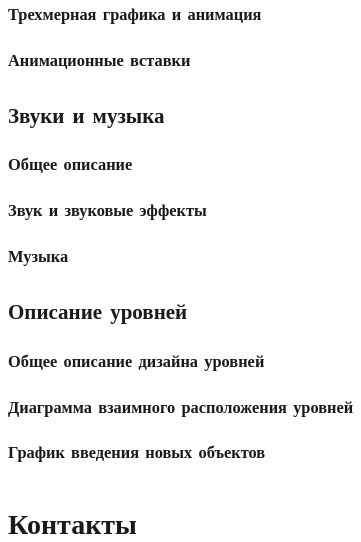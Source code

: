 \documentclass{article}
\begin{document}
	\subsubsection{Трехмерная графика и анимация}
	
	\subsubsection{Анимационные вставки}
	
	\subsection{Звуки и музыка}
	
	\subsubsection{Общее описание}
	
	\subsubsection{Звук и звуковые эффекты}
	
	\subsubsection{Музыка}
	
	\subsection{Описание уровней}
	
	\subsubsection{Общее описание дизайна уровней}
	
	\subsubsection{Диаграмма взаимного расположения уровней}
	
	\subsubsection{График введения новых объектов}
	
	\newpage
	\section{Контакты}
	
	\newpage
	
\end{document}
